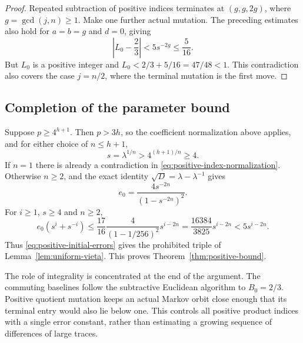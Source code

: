\begin{proof}
Repeated subtraction of positive indices terminates at $(g,g,2g)$,
where $g=\gcd(j,n)\geqslant1$. Make one further actual mutation.
The preceding estimates also hold for $a=b=g$ and $d=0$, giving
$$
 \left|L_0-\frac23\right|<5s^{-2g}\leqslant\frac5{16}.
$$
But $L_0$ is a positive integer and
$L_0<2/3+5/16=47/48<1$. This contradiction also covers the case
$j=n/2$, where the terminal mutation is the first move.
\end{proof}

\subsection{Completion of the parameter bound}

Suppose $p\geqslant4^{h+1}$. Then $p>3h$, so the coefficient
normalization above applies, and for either choice of $n\leqslant h+1$,
$$
 s=\lambda^{1/n}>4^{(h+1)/n}\geqslant4.
$$
If $n=1$ there is already a contradiction in
\eqref{eq:positive-index-normalization}. Otherwise $n\geqslant2$,
and the exact identity $\sqrt D=\lambda-\lambda^{-1}$ gives
$$
 e_0=\frac{4s^{-2n}}{(1-s^{-2n})^2}.
$$
For $i\geqslant1$, $s\geqslant4$ and $n\geqslant2$,
\begin{equation}\label{eq:positive-initial-uniform-bound}
 e_0(s^i+s^{-i})
 \leqslant\frac{17}{16}\frac4{(1-1/256)^2}s^{i-2n}
 =\frac{16384}{3825}s^{i-2n}<5s^{i-2n}.
\end{equation}
Thus \eqref{eq:positive-initial-errors} gives the prohibited triple
of Lemma~\ref{lem:uniform-vieta}. This proves
Theorem~\ref{thm:positive-bound}.

The role of integrality is concentrated at the end of the argument.
The commuting baselines follow the subtractive Euclidean algorithm to
$B_0=2/3$. Positive quotient mutation keeps an actual Markov orbit close
enough that its terminal entry would also lie below one. This controls
all positive product indices with a single error constant, rather than
estimating a growing sequence of differences of large traces.
